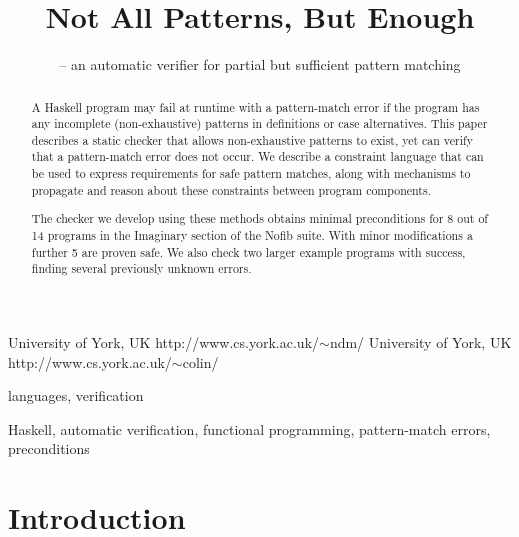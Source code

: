 \documentclass[preprint]{sigplanconf}
\newenvironment{discuss}
    {\noindent\hspace{-1.5mm}\vline\hspace{1mm}\vline\hspace{1mm}\begin{minipage}[h]{\linewidth}}
    {\end{minipage}}
\begin{document}
\copyrightdata{[to be supplied]}

\titlebanner{\today{} - \currenttime{}}        %
\preprintfooter{}   %

\title{Not All Patterns, But Enough}
\subtitle{ -- an automatic verifier for partial but sufficient pattern matching}

           {University of York, UK}
           {http://www.cs.york.ac.uk/$\sim$ndm/}
           {University of York, UK}
           {http://www.cs.york.ac.uk/$\sim$colin/}

\maketitle

\begin{abstract}
\begin{discuss}
A Haskell program may fail at runtime with a pattern-match error if the program has any incomplete (non-exhaustive) patterns in definitions or case alternatives. This paper describes a static checker that allows non-exhaustive patterns to exist, yet can verify that a pattern-match error does not occur. We describe a constraint language that can be used to express requirements for safe pattern matches, along with mechanisms to propagate and reason about these constraints between program components.

The checker we develop using these methods obtains minimal preconditions for 8 out of 14 programs in the Imaginary section of the Nofib suite. With minor modifications a further 5 are proven safe. We also check two larger example programs with success, finding several previously unknown errors.
\end{discuss}
\end{abstract}


\terms
languages, verification

\keywords
Haskell, automatic verification, functional programming, pattern-match errors, preconditions

\section{Introduction}
\label{sec:introduction}
\end{document}
